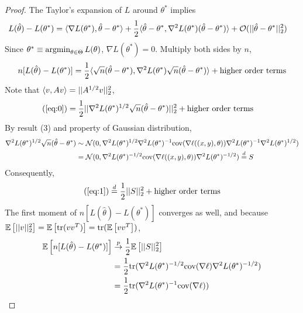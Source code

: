 \documentclass[11pt]{article}
\newcommand{\thetahat}[0]{\hat{\theta}}
\newcommand{\convp}[0]{\overset{p}{\rightarrow}}
\newcommand{\inv}[0]{^{-1}}
\newcommand{\cov}[0]{\text{cov}}
\newcommand{\tr}[0]{\text{tr}}
\begin{document}
\begin{proof}
		The Taylor's expansion of $L$ around $\theta^*$ implies
		\begin{align}
			L(\thetahat) - L(\theta^*) &= \inner{\nabla L(\theta^*)}{\thetahat - \theta^*} + \frac{1}{2} \inner{\thetahat - \theta^*}{\nabla^2 L(\theta^*) (\thetahat - \theta^*)} + \mc{O}(\norm{\thetahat - \theta^*}_2^2)
		\end{align}
		Since $\theta^* \equiv \operatorname*{argmin}_{\theta \in \Theta} L(\theta)$, $\nabla L(\theta^*) = 0$. Multiply both sides by $n$,
		\begin{align}
			n[L(\thetahat) - L(\theta^*)] = \frac{1}{2} \inner{\sqrt{n}(\thetahat - \theta^*)}{\nabla^2 L(\theta^*) \sqrt{n} (\thetahat - \theta^*)} + \tx{higher order terms} \label{eq:0}
		\end{align}	
		Note that $\langle {v}, {Av} \rangle = \vert \vert {A^{1/2}v} \vert \vert_2^2$,
		\begin{align}
			(\ref{eq:0}) &= \frac{1}{2} \norm{
				\nabla^2 L(\theta^*)^{1/2} \sqrt{n}(\thetahat - \theta^*) 
			}_2^2 + \tx{higher order terms} \label{eq:1}
		\end{align}
		By result (3) and property of Gaussian distribution,
		\begin{align}
			\nabla^2 L(\theta^*)^{1/2} \sqrt{n}(\thetahat - \theta^*)
			&\sim \mc{N}(0, \nabla^2 L(\theta^*)^{1/2} \nabla^2L(\theta^*)\inv \cov(\nabla \ell((x,y),\theta)) \nabla^2L(\theta^*)\inv \nabla^2 L(\theta^*)^{1/2})  \\
			&=\mc{N}(0, \nabla^2 L(\theta^*)^{-1/2} \cov(\nabla \ell((x,y),\theta)) \nabla^2 L(\theta^*)^{-1/2})
			\overset{d}{=} S
		\end{align}
		Consequently, 
		\begin{align}
			(\ref{eq:1}) \overset{d}{=} \frac{1}{2}\vert \vert {S} \vert \vert_2^2 + \text{{higher order terms}}
		\end{align}
		The first moment of $n[L(\thetahat) - L(\theta^*)]$ converges as well, and because $\expect{\norm{v}_2^2} = \expect{\tr(v v^T)} = \tr(\expect{v v^T})$,
		\begin{align}
			\expect{n[L(\thetahat) - L(\theta^*)]} &\convp \frac{1}{2} \expect{\norm{S}_2^2} \\
			&= \frac{1}{2} \tr(\nabla^2 L(\theta^*)^{-1/2} \cov(\nabla \ell) \nabla^2 L(\theta^*)^{-1/2}) \\
			&= \frac{1}{2} \tr(\nabla^2L(\theta^*)\inv \cov(\nabla \ell))
		\end{align}
	\end{proof}
\end{document}
